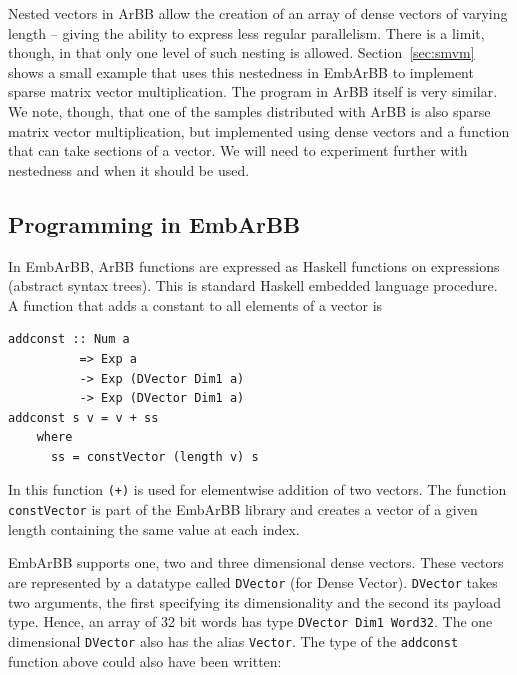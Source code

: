 Nested vectors in ArBB allow the creation of an array of dense vectors of varying length -- giving the ability to express less regular parallelism. There is a limit, though, in that only one level of such nesting is allowed. Section~\ref{sec:smvm} shows a small example that uses this nestedness in EmbArBB to implement sparse matrix vector multiplication. The program in ArBB itself is very similar. We note, though, that one of the samples distributed with ArBB is also sparse matrix vector multiplication, but implemented using dense vectors and a function that can take sections of a vector. We will need to experiment further with nestedness and when it should be used.



\subsection{Programming in EmbArBB} 
\label{sec:Programming}



In EmbArBB, ArBB functions are expressed as Haskell functions on expressions
(abstract syntax trees). This is standard Haskell embedded language procedure. 
A function that adds a constant to all elements of a vector is

\pagebreak

\begin{verbatim}
addconst :: Num a 
          => Exp a 
          -> Exp (DVector Dim1 a) 
          -> Exp (DVector Dim1 a) 
addconst s v = v + ss 
    where 
      ss = constVector (length v) s 
\end{verbatim}

In this function {\tt (+)} is used for elementwise addition of two vectors. 
The function {\tt constVector} is part of the EmbArBB library and creates a vector 
of a given length containing the same value at each index. 

EmbArBB supports one, two and three dimensional dense vectors. These vectors are 
represented by a datatype called {\tt DVector} (for Dense Vector). {\tt DVector} takes two 
arguments, the first specifying its dimensionality and the second its payload 
type. Hence, an array of 32 bit words has type {\tt DVector Dim1 Word32}.
The one dimensional {\tt DVector} also has the alias {\tt Vector}. The type 
of the {\tt addconst} function above could also have been written: 


